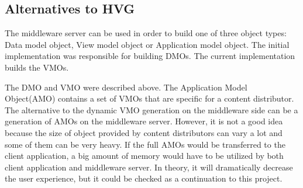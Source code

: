\subsection{Alternatives to HVG}

The middleware server can be used in order to build one of three object types: Data model object, View model object or Application model object. The initial implementation was responsible for building DMOs. The current implementation builds the VMOs.

The DMO and VMO were described above. The Application Model Object(AMO) contains a set of VMOs that are specific for a content distributor. The alternative to the dynamic VMO generation on the middleware side can be a generation of AMOs on the middleware server. However, it is not a good idea because the size of object provided by content distributors can vary a lot and some of them can be very heavy. If the full AMOs would be transferred to the client application, a big amount of memory would have to be utilized by both client application and middleware server. In theory, it will dramatically decrease the user experience, but it could be checked as a continuation to this project.


\newpage
